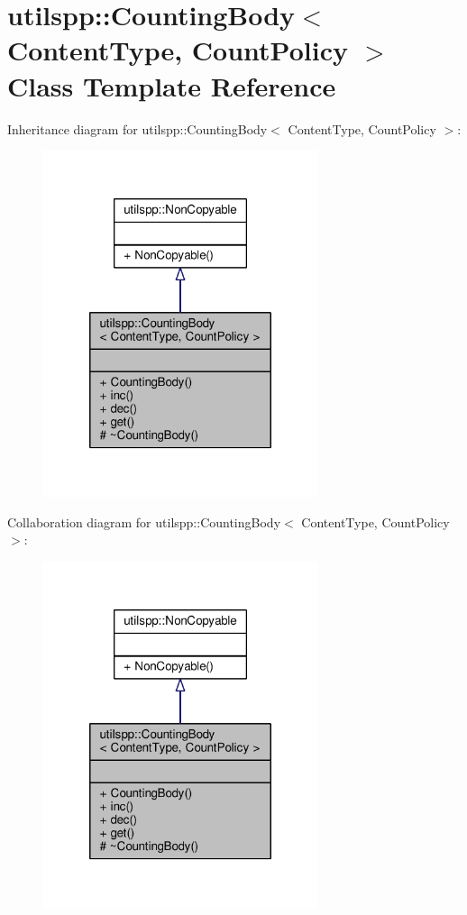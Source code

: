 \hypertarget{classutilspp_1_1CountingBody}{\section{utilspp\-:\-:Counting\-Body$<$ Content\-Type, Count\-Policy $>$ Class Template Reference}
\label{classutilspp_1_1CountingBody}
}


Inheritance diagram for utilspp\-:\-:Counting\-Body$<$ Content\-Type, Count\-Policy $>$\-:\nopagebreak
\begin{figure}[H]
\begin{center}
\leavevmode
\includegraphics[width=228pt]{classutilspp_1_1CountingBody__inherit__graph}
\end{center}
\end{figure}


Collaboration diagram for utilspp\-:\-:Counting\-Body$<$ Content\-Type, Count\-Policy $>$\-:\nopagebreak
\begin{figure}[H]
\begin{center}
\leavevmode
\includegraphics[width=228pt]{classutilspp_1_1CountingBody__coll__graph}
\end{center}
\end{figure}
